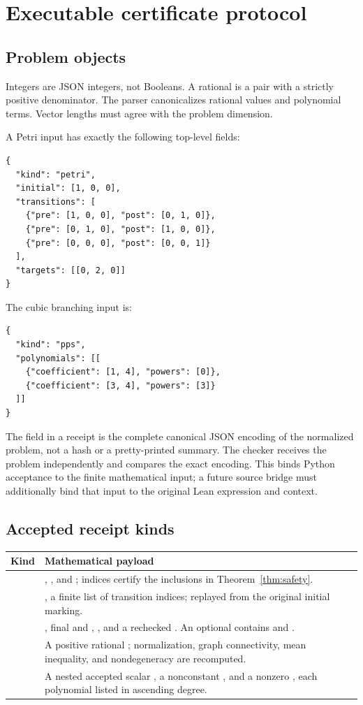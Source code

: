 \section{Executable certificate protocol}
\subsection{Problem objects}
Integers are JSON integers, not Booleans. A rational is a pair  with a strictly positive denominator. The parser canonicalizes rational values and polynomial terms. Vector lengths must agree with the problem dimension.

A Petri input has exactly the following top-level fields:
\begin{lstlisting}
{
  "kind": "petri",
  "initial": [1, 0, 0],
  "transitions": [
    {"pre": [1, 0, 0], "post": [0, 1, 0]},
    {"pre": [0, 1, 0], "post": [1, 0, 0]},
    {"pre": [0, 0, 0], "post": [0, 0, 1]}
  ],
  "targets": [[0, 2, 0]]
}
\end{lstlisting}
The cubic branching input is:
\begin{lstlisting}
{
  "kind": "pps",
  "polynomials": [[
    {"coefficient": [1, 4], "powers": [0]},
    {"coefficient": [3, 4], "powers": [3]}
  ]]
}
\end{lstlisting}
The  field in a receipt is the complete canonical JSON encoding of the normalized problem, not a hash or a pretty-printed summary. The checker receives the problem independently and compares the exact encoding. This binds Python acceptance to the finite mathematical input; a future source bridge must additionally bind that input to the original Lean expression and context.

\subsection{Accepted receipt kinds}
\begin{longtable}{P{0.22\textwidth}P{0.68\textwidth}}
\toprule
Kind & Mathematical payload \\
\midrule
{} & , , and ; indices certify the inclusions in Theorem~\ref{thm:safety}.\\[4pt]
 & , a finite list of transition indices; replayed from the original initial marking.\\[4pt]
 & , final  and , , and a rechecked . An optional  contains  and .\\[4pt]
 & A positive rational ; normalization, graph connectivity, mean inequality, and nondegeneracy are recomputed.\\[4pt]
 & A nested accepted scalar , a nonconstant , and a nonzero , each polynomial listed in ascending degree.\\
\bottomrule
\end{longtable}

